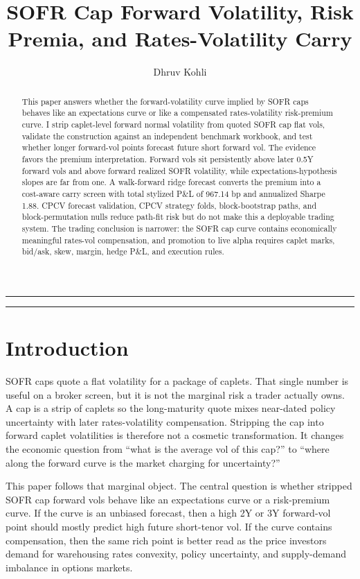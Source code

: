 \documentclass[12pt]{article}
\title{\vspace{-0.5cm}SOFR Cap Forward Volatility, Risk Premia, and Rates-Volatility Carry}
\author{Dhruv Kohli}
\date{}
\begin{document}
\maketitle
\vspace{-0.5cm}
\noindent\rule{\textwidth}{0.4pt}

\begin{abstract}
This paper answers whether the forward-volatility curve implied by SOFR caps behaves like an expectations curve or like a compensated rates-volatility risk-premium curve. I strip caplet-level forward normal volatility from quoted SOFR cap flat vols, validate the construction against an independent benchmark workbook, and test whether longer forward-vol points forecast future short forward vol. The evidence favors the premium interpretation. Forward vols sit persistently above later 0.5Y forward vols and above forward realized SOFR volatility, while expectations-hypothesis slopes are far from one. A walk-forward ridge forecast converts the premium into a cost-aware carry screen with total stylized P\&L of 967.14 bp and annualized Sharpe 1.88. CPCV forecast validation, CPCV strategy folds, block-bootstrap paths, and block-permutation nulls reduce path-fit risk but do not make this a deployable trading system. The trading conclusion is narrower: the SOFR cap curve contains economically meaningful rates-vol compensation, and promotion to live alpha requires caplet marks, bid/ask, skew, margin, hedge P\&L, and execution rules.
\end{abstract}

\noindent\rule{\textwidth}{0.4pt}

\section{Introduction}

SOFR caps quote a flat volatility for a package of caplets. That single number is useful on a broker screen, but it is not the marginal risk a trader actually owns. A cap is a strip of caplets so the long-maturity quote mixes near-dated policy uncertainty with later rates-volatility compensation. Stripping the cap into forward caplet volatilities is therefore not a cosmetic transformation. It changes the economic question from ``what is the average vol of this cap?'' to ``where along the forward curve is the market charging for uncertainty?''

This paper follows that marginal object. The central question is whether stripped SOFR cap forward vols behave like an expectations curve or a risk-premium curve. If the curve is an unbiased forecast, then a high 2Y or 3Y forward-vol point should mostly predict high future short-tenor vol. If the curve contains compensation, then the same rich point is better read as the price investors demand for warehousing rates convexity, policy uncertainty, and supply-demand imbalance in options markets.
\end{document}
